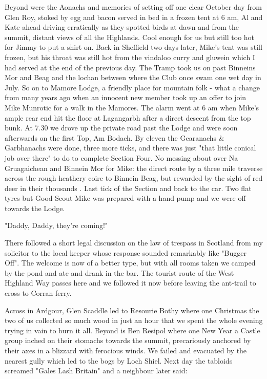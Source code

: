 \documentclass[a5paper,openany,font 10pt]{scrbook}
\begin{document}
Beyond were the Aonachs and memories of setting off one
clear October day from Glen Roy, stoked by egg and  bacon served
in bed in a frozen tent at 6 am, Al and  Kate ahead driving
erratically as they spotted birds at dawn  and from the summit,
distant views of all the Highlands. Cool enough for us but still
too hot for Jimmy to put a shirt on. Back in Sheffield two days
later, Mike's tent was still frozen, but his throat was still hot
from the vindaloo curry and gluwein which I had served at the end
of the previous day. The Tramp took us on past Binneins Mor and
Beag and the lochan between where the Club  once swam one wet day
in July. So on to Mamore Lodge, a friendly place for mountain
folk - what a change from  many years ago when an innocent new
member took up an offer to join Mike Munrotic for a walk in the
Mamores. The alarm went at 6 am when Mike's ample rear end hit
the floor at Lagangarbh  after a direct descent from the top
bunk. At 7.30 we drove up the private road past the Lodge and
were soon afterwards on the first Top, Am Bodach. By eleven the
Gearanachs \& Garbhanachs were done, three more ticks, and there
was just "that little conical job over there" to do to complete
Section Four. No messing about over Na Gruagaichean and Binnein
Mor for Mike: the direct route by a three mile traverse across
the rough heathery coire to Binnein Beag, but rewarded by the
sight of red deer in their thousands . Last tick of the Section
and back to the car. Two flat tyres but Good Scout Mike was
prepared with a hand pump and we were off towards the Lodge.

"Daddy, Daddy, they're coming!"

There followed a short legal discussion on the law of
trespass in Scotland from my solicitor to the local keeper whose
response sounded remarkably like "Bugger Off". The welcome is now
of a better type, but with all rooms taken we camped by the pond
and ate and drank in the bar. The tourist route of the West
Highland Way passes here and we followed it now before leaving
the ant-trail to cross to Corran ferry.

Across in Ardgour, Glen Scaddle led to Resourie Bothy where
one Christmas the two of us collected so much wood in just an
hour that we spent the whole evening trying in vain to burn it
all. Beyond is Ben Resipol where one New Year a Castle group
inched on their stomachs towards the summit, precariously
anchored by their axes in a blizzard with ferocious winds. We
failed and evacuated by the nearest gully which led to the bogs
by Loch Shiel. Next day the tabloids screamed "Gales Lash
Britain" and a neighbour later said:
\end{document}
